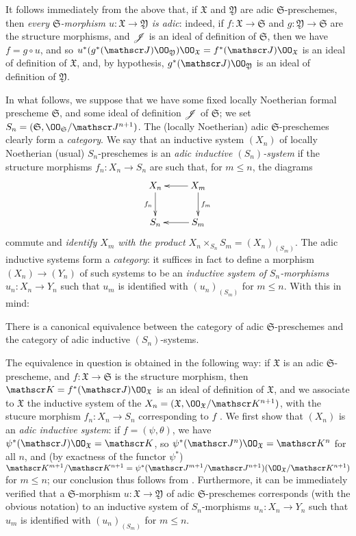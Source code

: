 It follows immediately from the above that, if $\mathfrak{X}$ and $\mathfrak{Y}$ are adic $\mathfrak{S}$-preschemes, then \emph{every $\mathfrak{S}$-morphism $u:\mathfrak{X}\to\mathfrak{Y}$ is adic}:
indeed, if $f:\mathfrak{X}\to\mathfrak{S}$ and $g:\mathfrak{Y}\to\mathfrak{S}$ are the structure morphisms, and $\mathscr{J}$ is an ideal of definition of $\mathfrak{S}$, then we have $f=g\circ u$, and so $u^*(g^*(\sh{J})\OO_\mathfrak{Y})\OO_\mathfrak{X}=f^*(\sh{J})\OO_\mathfrak{X}$ is an ideal of definition of $\mathfrak{X}$, and, by hypothesis, $g^*(\sh{J})\OO_\mathfrak{Y}$ is an ideal of definition of $\mathfrak{Y}$.

\begin{env}[10.12.2]
\label{1.10.12.2}
In what follows, we suppose that we have some fixed locally Noetherian formal prescheme $\mathfrak{S}$, and some ideal of definition $\mathscr{J}$ of $\mathfrak{S}$;
we set $S_n=(\mathfrak{S},\OO_\mathfrak{S}/\sh{J}^{n+1})$.
The (locally Noetherian) adic $\mathfrak{S}$-preschemes clearly form a \emph{category}.
We say that an inductive system $(X_n)$ of locally Noetherian (usual) $S_n$-preschemes is an \emph{adic inductive $(S_n)$-system} if the structure morphisms $f_n:X_n\to S_n$ are such that, for $m\leq n$, the diagrams
\[
  \xymatrix{
    X_n \ar[d]_{f_n}
    & X_m \ar[l] \ar[d]^{f_m}\\
    S_n
    & S_m \ar[l]
  }
\]
commute and \emph{identify $X_m$ with the product $X_n\times_{S_n}S_m=(X_n)_{(S_m)}$}.
The adic inductive systems form a \emph{category}:
it suffices in fact to define a morphism $(X_n)\to(Y_n)$ of such systems to be an \emph{inductive system of $S_n$-morphisms $u_n:X_n\to Y_n$} such that $u_m$ is identified with $(u_n)_{(S_m)}$ for $m\leq n$.
With this in mind:
\end{env}

\begin{thm}[10.12.3]
\label{1.10.12.3}
There is a canonical equivalence between the category of adic $\mathfrak{S}$-preschemes and the category of adic inductive $(S_n)$-systems.
\end{thm}

The equivalence in question is obtained in the following way:
if $\mathfrak{X}$ is an adic $\mathfrak{S}$-prescheme, and $f:\mathfrak{X}\to\mathfrak{S}$ is the structure morphism, then $\sh{K}=f^*(\sh{J})\OO_\mathfrak{X}$ is an ideal of definition of $\mathfrak{X}$, and we associate to $\mathfrak{X}$ the inductive system of the $X_n=(\mathfrak{X},\OO_\mathfrak{X}/\sh{K}^{n+1})$, with the stucure morphism $f_n:X_n\to S_n$ corresponding to $f$ .
We first show that $(X_n)$ is an \emph{adic inductive system}:
if $f=(\psi,\theta)$, we have $\psi^*(\sh{J})\OO_\mathfrak{X}=\sh{K}$, so $\psi^*(\sh{J}^n)\OO_\mathfrak{X}=\sh{K}^n$ for all $n$, and (by exactness of the functor $\psi^*$) $\sh{K}^{m+1}/\sh{K}^{n+1}=\psi^*(\sh{J}^{m+1}/\sh{J}^{n+1})(\OO_\mathfrak{X}/\sh{K}^{n+1})$ for $m\leq n$;
our conclusion thus follows from .
Furthermore, it can be immediately verified that a $\mathfrak{S}$-morphism $u:\mathfrak{X}\to\mathfrak{Y}$ of adic $\mathfrak{S}$-preschemes corresponds (with the obvious notation)
to an inductive system of $S_n$-morphisms $u_n:X_n\to Y_n$ such that $u_m$ is identified with $(u_n)_{(S_m)}$ for $m\leq n$.

